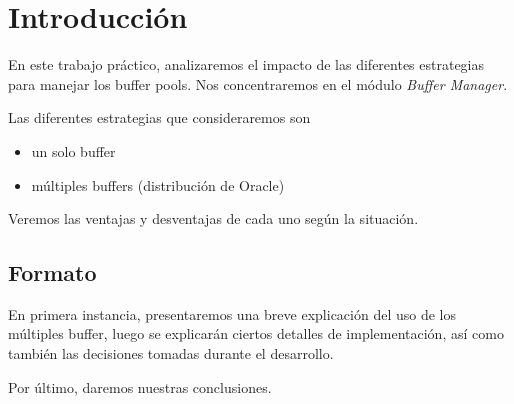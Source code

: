 \section{Introducci\'on}

En este trabajo pr\'actico, analizaremos el impacto de las diferentes
estrategias para manejar los buffer pools.
Nos concentraremos en el m\'odulo \textit{Buffer Manager}.

\vspace*{0.3cm}

Las diferentes estrategias que consideraremos son

\begin{itemize}
    \item
            un solo buffer
    \item
            múltiples buffers (distribución de Oracle)    
\end{itemize}

\vspace*{0.3cm}

Veremos las ventajas y desventajas de cada uno seg\'un la situaci\'on.

\subsection{Formato}

\vspace*{0.3cm}

En primera instancia, presentaremos una breve explicación
del uso de los múltiples buffer, luego se explicar\'an ciertos 
detalles de implementaci\'on, as\'i como tambi\'en las decisiones 
tomadas durante el desarrollo.

\vspace*{0.3cm}

Por \'ultimo, daremos nuestras conclusiones.


